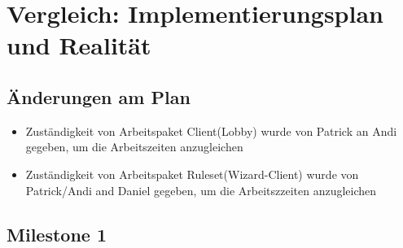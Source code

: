 \documentclass{article}
\begin{document}
\section{Vergleich: Implementierungsplan und Realität}

\subsection{Änderungen am Plan}
\begin{itemize}
\item Zuständigkeit von Arbeitspaket Client(Lobby) wurde von Patrick an Andi gegeben, um die Arbeitszeiten anzugleichen
\item Zuständigkeit von Arbeitspaket Ruleset(Wizard-Client) wurde von Patrick/Andi and Daniel gegeben, um die Arbeitszzeiten anzugleichen
\end{itemize}

\subsection{Milestone 1}
\end{document}
